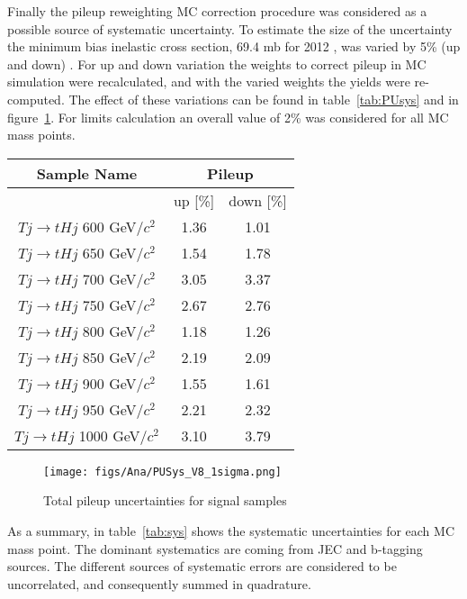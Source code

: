 Finally the pileup reweighting MC correction procedure was considered as a possible source of systematic uncertainty. To estimate the size of the uncertainty the minimum bias inelastic cross section, 69.4 mb for 2012 , was varied by 5\% (up and down) . For up and down variation the weights to correct pileup in MC simulation were recalculated, and with the varied weights the yields were re-computed. The effect of these variations can be found in table~\ref{tab:PUsys} and in figure~\ref{fig:TotalPUSys}. For limits calculation an overall value of 2\% was considered for all MC mass points.

\begin{table*}[htbH]
\begin{center}
\begin{tabular}{|c|c|c|}
\hline 
Sample Name & \multicolumn{2}{c|}{Pileup} \\
\hline
 & up [\%] & down [\%] \\
\hline
$Tj\rightarrow tHj$ 600 GeV/$c^{2}$ & 1.36 & 1.01 \\
$Tj\rightarrow tHj$ 650 GeV/$c^{2}$ & 1.54 & 1.78 \\
$Tj\rightarrow tHj$ 700 GeV/$c^{2}$ & 3.05 & 3.37 \\
$Tj\rightarrow tHj$ 750 GeV/$c^{2}$ & 2.67 & 2.76 \\
$Tj\rightarrow tHj$ 800 GeV/$c^{2}$ & 1.18 & 1.26 \\
$Tj\rightarrow tHj$ 850 GeV/$c^{2}$ & 2.19 & 2.09 \\
$Tj\rightarrow tHj$ 900 GeV/$c^{2}$ & 1.55 & 1.61 \\
$Tj\rightarrow tHj$ 950 GeV/$c^{2}$ & 2.21 & 2.32 \\
$Tj\rightarrow tHj$ 1000 GeV/$c^{2}$ & 3.10 & 3.79 \\
\hline
\end{tabular}
\caption{Pileup uncertainties for signal samples\label{tab:PUsys}}
\end{center}
\end{table*}

\begin{figure}[!Hhtbp]
  \begin{center}
    \texttt{[image: figs/Ana/PUSys\_V8\_1sigma.png]}
    \caption{Total pileup uncertainties for signal samples}
    \label{fig:TotalPUSys}
  \end{center}
\end{figure}

As a summary, in table~\ref{tab:sys} shows the systematic uncertainties for each MC mass point. The dominant systematics are coming from JEC and b-tagging sources. The different sources of systematic errors are considered to be uncorrelated, and consequently summed in quadrature. %

